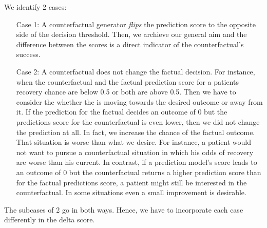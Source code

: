 \documentclass[./../../paper.tex]{subfiles}
\begin{document}
We identify 2 cases:
\begin{enumerate}
    \item[Case 1:] A counterfactual generator \emph{flips} the prediction score to the opposite side of the decision threshold. Then, we archieve our general aim and the difference between the scores is a direct indicator of the counterfactual's success.   
    \item[Case 2:] A counterfactual does not change the factual decision. For instance, when the counterfactual and the factual prediction score for a patients recovery chance are below 0.5 or both are above 0.5. Then we have to consider the whether the is moving towards the desired outcome or away from it.
    \subitem[2.1] If the prediction for the factual decides an outcome of 0 but the predictions score for the counterfactual is even lower, then we did not change the prediction at all. In fact, we increase the chance of the factual outcome. That situation is worse than what we desire. For instance, a patient would not want to pursue a counterfactual situation in which his odds of recovery are worse than his current.   
    \subitem[2.2] In contrast, if a prediction model's score leads to an outcome of 0 but the counterfactual returns a higher prediction score than for the factual predictions score, a patient might still be interested in the counterfactual. In some situations even a small improvement is desirable.   
\end{enumerate}

\noindent The subcases of 2 go in both ways. Hence, we have to incorporate each case differently in the delta score. 

\end{document}
